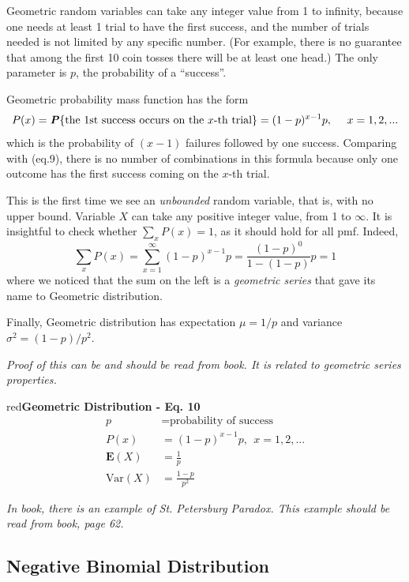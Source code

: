 \documentclass{article}
\newenvironment{formula}[1]{\begin{mybox}{red}{\textbf{#1}}}{\end{mybox}}
\newcommand{\prob}[1]{\textbf{\textit{P}}\{#1\}}
\begin{document}
Geometric random variables can take any integer value from 1 to infinity, because one needs at least 1 trial to have the first success, and the number of trials needed is not limited by any specific number. (For example, there is no guarantee that among the first 10 coin tosses there will be at least one head.) The only parameter is $p$, the probability of a ``success''.

Geometric probability mass function has the form
\begin{equation*}
    P(x) = \prob{\text{the 1st success occurs on the $x$-th trial}} = (1-p)^{x-1}p,\ \ \ \ x = 1, 2, ...
\end{equation*}
which is the probability of $(x - 1)$ failures followed by one success. Comparing with (eq.9), there is no number of combinations in this formula because only one outcome has the first success coming on the $x$-th trial.

This is the first time we see an \textit{unbounded} random variable, that is, with no upper bound. Variable $X$ can take any positive integer value, from 1 to $\infty$. It is insightful to check whether
$\sum_x P(x) = 1$, as it should hold for all pmf. Indeed,
\begin{equation*}
    \sum_x P(x) = \sum_{x=1}^{\infty} (1-p)^{x-1} p = \frac{(1-p)^0}{1 - (1-p)} p = 1
\end{equation*}
where we noticed that the sum on the left is a \textit{geometric series} that gave its name to Geometric distribution.

Finally, Geometric distribution has expectation $\mu = 1/p$ and variance $\sigma^2 = (1 - p)/p^2$.

\textit{Proof of this can be and should be read from book. It is related to geometric series properties.}

\begin{formula}{Geometric Distribution - Eq. 10}
\begin{align*}
    p &= \text{probability of success}\\
    P(x) &= (1-p)^{x-1} p,\ \ x = 1, 2, ...\\
    \mathbf{E}(X) &= \frac{1}{p}\\
    \text{Var}(X) &= \frac{1-p}{p^2}
\end{align*}
\end{formula}

\textit{In book, there is an example of \textit{St. Petersburg Paradox}. This example should be read from book, page 62.}

\subsection{Negative Binomial Distribution}
\end{document}

